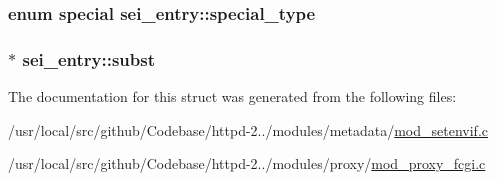 \subsubsection[{\texorpdfstring{special\+\_\+type}{special_type}}]{\setlength{\rightskip}{0pt plus 5cm}enum {\bf special} sei\+\_\+entry\+::special\+\_\+type}\hypertarget{structsei__entry_a87f0c367adab2907a00c91693971fe8f}{}\label{structsei__entry_a87f0c367adab2907a00c91693971fe8f}
\subsubsection[{\texorpdfstring{subst}{subst}}]{$\ast$ sei\+\_\+entry\+::subst}\hypertarget{structsei__entry_a5e6c40bedfa1b96996da1599c8f18c3e}{}\label{structsei__entry_a5e6c40bedfa1b96996da1599c8f18c3e}


The documentation for this struct was generated from the following files\+:\begin{DoxyCompactItemize}
\item 
/usr/local/src/github/\+Codebase/httpd-\/2../modules/metadata/\hyperlink{mod__setenvif_8c}{mod\+\_\+setenvif.\+c}\item 
/usr/local/src/github/\+Codebase/httpd-\/2../modules/proxy/\hyperlink{mod__proxy__fcgi_8c}{mod\+\_\+proxy\+\_\+fcgi.\+c}\end{DoxyCompactItemize}
